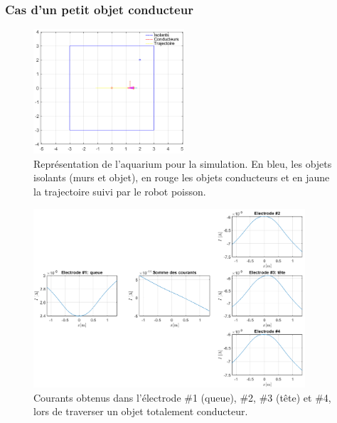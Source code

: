 \subsubsection{Cas d'un petit objet conducteur}
\begin{figure}[h!]
    \centering
    \includegraphics[width=0.5\textwidth]{assets/plot_currents/objet_conducteur_2/objet_conducteur_2_trajectoire.png}
    \caption{Représentation de l'aquarium pour la simulation. En bleu, les objets isolants (murs et objet), en rouge les objets conducteurs et en jaune la trajectoire suivi par le robot poisson.}
    \label{fig:objet_conducteur_2_trajectoire}
\end{figure}
\begin{figure}[h!]
    \centering
    \includegraphics[width=0.9\textwidth]{assets/plot_currents/objet_conducteur_2/objet_conducteur_2.png}
    \caption{Courants obtenus dans l'électrode \#1 (queue), \#2, \#3 (tête) et \#4, lors de traverser un objet totalement conducteur.}
    \label{fig:objet_conducteur_2}
\end{figure}
\clearpage
